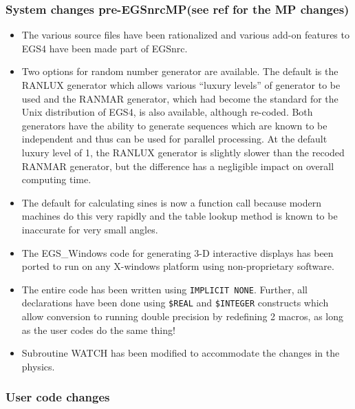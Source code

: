 \subsubsection[System changes]{System changes pre-EGSnrcMP(see
ref\cite{Ka03} for the MP changes)}
\begin{itemize}

\item The various source files have been rationalized and various add-on
features to EGS4 have been made part of EGSnrc.

  
\item Two options for random number generator are available. The
default is the RANLUX generator which allows various ``luxury levels''
of generator to be used and the RANMAR generator, which had become the
standard for the Unix distribution of EGS4, is also available, although
re-coded.  Both generators have the ability to generate sequences which
are known to be independent and thus can be used for parallel processing.
At the default luxury level of 1, the RANLUX generator is slightly slower
than the recoded RANMAR generator, but the difference has a negligible
impact on overall computing time.

\item The default for calculating sines is now a function call because
modern machines do this very rapidly and the table lookup method is known
to be inaccurate for very small angles.

\item The EGS\_Windows code for generating  3-D interactive displays has
been ported to run on any X-windows platform using non-proprietary
software.

\item The entire code has been written using {\tt IMPLICIT NONE}. Further,
all declarations have been done using {\tt \$REAL} and {\tt \$INTEGER}
constructs which allow conversion to running double precision by redefining
2 macros, as long as the user codes  do the same thing!

\item Subroutine WATCH has been modified to accommodate the changes in the
physics.

\end{itemize}

\subsubsection{User code changes}

